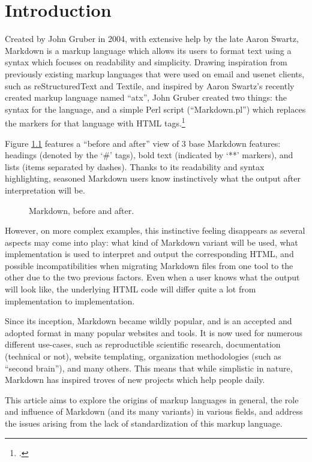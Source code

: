 \chapter{Introduction}
\label{chap:introduction}

\vspace{1cm}

Created by John Gruber in 2004, with extensive help by the late Aaron Swartz, Markdown is a markup language which allows its users to format
text using a syntax which focuses on readability and simplicity.
Drawing inspiration from previously existing markup languages that were used on email and usenet clients, such as reStructuredText and Textile,
and inspired by Aaron Swartz's recently created markup language named ``atx'', John Gruber created two things: the syntax for the language, and a simple
Perl script (``Markdown.pl'') which replaces the markers for that language with HTML tags.\footcite{gruber2004markdown}\newline

Figure \ref{fig:example-simple-syntax} features a ``before and after'' view of 3 base Markdown features: headings (denoted by the `\#' tags),
bold text (indicated by `**' markers), and lists (items separated by dashes). Thanks to its readability and syntax highlighting, seasoned
Markdown users know instinctively what the output after interpretation will be.

\begin{figure}[H]%
    \hspace{-3cm}
    \qquad
    \caption{Markdown, before and after.}
    \label{fig:example-simple-syntax}
\end{figure}

\newpage

However, on more complex examples, this instinctive feeling disappears as several aspects may come into play: what kind of Markdown variant will
be used, what implementation is used to interpret and output the corresponding HTML, and possible incompatibilities when migrating Markdown files
from one tool to the other due to the two previous factors. Even when a user knows what the output will look like, the underlying HTML code
will differ quite a lot from implementation to implementation.\newline

Since its inception, Markdown became wildly popular, and is an accepted and adopted format in many popular websites and tools. It is now used for
numerous different use-cases, such as reproductible scientific research, documentation (technical or not), website templating, organization
methodologies (such as ``second brain''), and many others. This means that while simplistic in nature, Markdown has inspired troves of
new projects which help people daily.\newline

This article aims to explore the origins of markup languages in general, the role and influence of Markdown (and its many variants)
in various fields, and address the issues arising from the lack of standardization of this markup language.